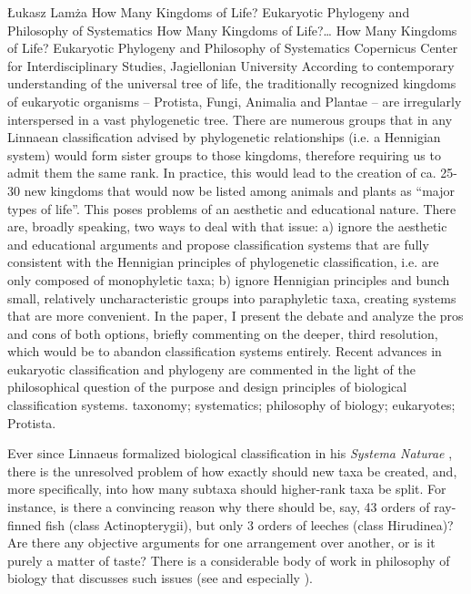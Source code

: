 \begin{artengenv}
	{Łukasz Lamża}
	{How Many Kingdoms of Life? Eukaryotic Phylogeny and Philosophy of Systematics}
	{How Many Kingdoms of Life?\ldots}
	{How Many Kingdoms of Life? Eukaryotic Phylogeny and Philosophy of Systematics}
	{Copernicus Center for Interdisciplinary Studies, Jagiellonian University}
	{According to contemporary understanding of the universal tree of life, the traditionally recognized kingdoms of
		eukaryotic organisms -- Protista, Fungi, Animalia and Plantae -- are irregularly interspersed in a vast phylogenetic
		tree. There are numerous groups that in any Linnaean classification advised by phylogenetic relationships (i.e. a
		Hennigian system) would form sister groups to those kingdoms, therefore requiring us to admit them the same rank. In
		practice, this would lead to the creation of ca. 25-30 new kingdoms that would now be listed among animals and plants
		as ``major types of life''. This poses problems of an aesthetic and educational nature. There are, broadly speaking, two
		ways to deal with that issue: a) ignore the aesthetic and educational arguments and propose classification systems that
		are fully consistent with the Hennigian principles of phylogenetic classification, i.e. are only composed of
		monophyletic taxa; b) ignore Hennigian principles and bunch small, relatively uncharacteristic groups into paraphyletic
		taxa, creating systems that are more convenient. In the paper, I present the debate and analyze the pros and cons of
		both options, briefly commenting on the deeper, third resolution, which would be to abandon classification systems
		entirely. Recent advances in eukaryotic classification and phylogeny are commented in the light of the philosophical
		question of the purpose and design principles of biological classification systems.}
	{taxonomy; systematics; philosophy of biology; eukaryotes; Protista.}



\lettrine[loversize=0.13,lines=2,lraise=-0.05,nindent=0em,findent=0.2pt]%
{E}{}ver since Linnaeus formalized biological classification in his \textit{Systema Naturae}
\parencite{linnaeus_systema_1788},
there is the unresolved problem of how exactly should new taxa be created,
and, more specifically, into how many subtaxa should higher-rank taxa be split. For instance, is there a convincing
reason why there should be, say, 43 orders of ray-finned fish (class Actinopterygii), but only 3 orders of leeches
(class Hirudinea)? Are there any objective arguments for one arrangement over another, or is it purely a matter of
taste? There is a considerable body of work in philosophy of biology that discusses such issues
(see \cite{hull_effect_1965,hull_contemporary_1970,schuh_biological_2011} and especially \cite{mayr_classifications_2002}).


\end{artengenv}
